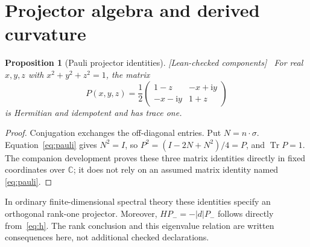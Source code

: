 \documentclass[11pt]{article}
\newtheorem{proposition}[theorem]{Proposition}
\theoremstyle{definition}\newtheorem{definition}[theorem]{Definition}
\theoremstyle{remark}\newtheorem{remark}[theorem]{Remark}
\newcommand{\Tr}{\operatorname{Tr}}
\newcommand{\ii}{\mathrm{i}}
\newcommand{\C}{\mathbb{C}}
\newcommand{\checked}{\textnormal{\small[Lean-checked components]}\ }
\begin{document}
\section{Projector algebra and derived curvature}
\begin{proposition}[Pauli projector identities]\label{prop:projector}\checked
For real $x,y,z$ with $x^2+y^2+z^2=1$, the matrix
\begin{equation}\label{eq:pentries}
 P(x,y,z)=\frac12\begin{pmatrix}
 1-z&-x+\ii y\\-x-\ii y&1+z
 \end{pmatrix}
\end{equation}
is Hermitian and idempotent and has trace one.
\end{proposition}
\begin{proof}
Conjugation exchanges the off-diagonal entries. Put $N=n\cdot\sigma$. Equation~\eqref{eq:pauli} gives $N^2=I$, so
$P^2=(I-2N+N^2)/4=P$, and $\Tr P=1$.
The companion development proves these three matrix identities directly in fixed coordinates over $\C$; it does not rely on an assumed matrix identity named \eqref{eq:pauli}.
\end{proof}
In ordinary finite-dimensional spectral theory these identities specify an orthogonal rank-one projector. Moreover, $HP_-=-|d|P_-$ follows directly from~\eqref{eq:h}. The rank conclusion and this eigenvalue relation are written consequences here, not additional checked declarations.
\end{document}

